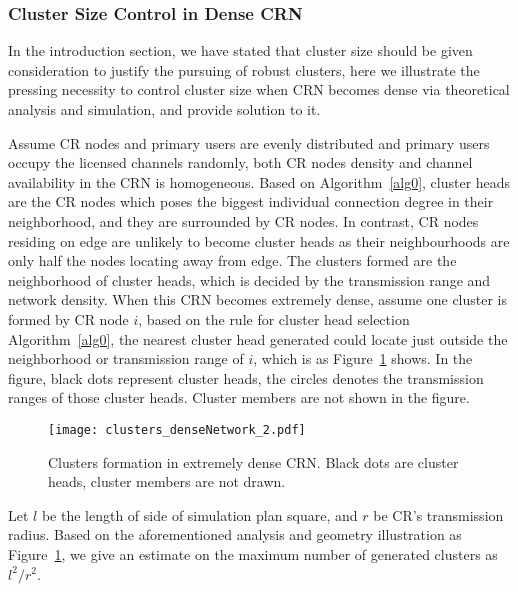 \subsubsection*{Cluster Size Control in Dense CRN}
\label{cluster_pruning}
In the introduction section, we have stated that cluster size should be given consideration to justify the pursuing of robust clusters, here we illustrate the pressing necessity to control cluster size when CRN becomes dense via theoretical analysis and simulation, and provide solution to it.

Assume CR nodes and primary users are evenly distributed and primary users occupy the licensed channels randomly, \ie both CR nodes density and channel availability in the CRN is homogeneous.
Based on Algorithm~\ref{alg0}, cluster heads are the CR nodes which poses the biggest individual connection degree in their neighborhood, and they are surrounded by CR nodes.
In contrast, CR nodes residing on edge are unlikely to become cluster heads as their neighbourhoods are only half the nodes locating away from edge.
The clusters formed are the neighborhood of cluster heads, which is decided by the transmission range and network density.
When this CRN becomes extremely dense, assume one cluster is formed by CR node $i$, based on the rule for cluster head selection Algorithm~\ref{alg0}, the nearest cluster head generated could locate just outside the neighborhood or transmission range of $i$, which is as Figure~\ref{clusters_denseNetwork} shows.
%
In the figure, black dots represent cluster heads, the circles denotes the transmission ranges of those cluster heads.
Cluster members are not shown in the figure.
\begin{figure}[h!]
  \centering
  \texttt{[image: clusters\_denseNetwork\_2.pdf]}
  \caption{Clusters formation in extremely dense CRN. Black dots are cluster heads, cluster members are not drawn.}
  \label{clusters_denseNetwork}
\end{figure}
Let $l$ be the length of side of simulation plan square, and $r$ be CR's transmission radius.
Based on the aforementioned analysis and geometry illustration as Figure~\ref{clusters_denseNetwork}, we give an estimate on the maximum number of generated clusters as $l^2/r^2$.

